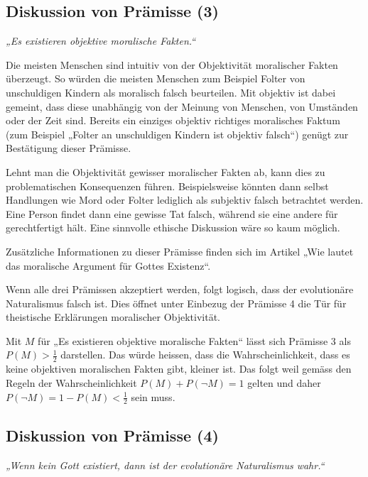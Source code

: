 \documentclass[11pt,a4paper]{article}
\begin{document}
	\subsection{Diskussion von Prämisse (3)}
	
	\textit{„Es existieren objektive moralische Fakten.“}
	
	Die meisten Menschen sind intuitiv von der Objektivität moralischer Fakten überzeugt. So würden die meisten Menschen zum Beispiel Folter von unschuldigen Kindern als moralisch falsch beurteilen. Mit objektiv ist dabei gemeint, dass diese unabhängig von der Meinung von Menschen, von Umständen oder der Zeit sind. Bereits ein einziges objektiv richtiges moralisches Faktum (zum Beispiel „Folter an unschuldigen Kindern ist objektiv falsch“) genügt zur Bestätigung dieser Prämisse.
	
	Lehnt man die Objektivität gewisser moralischer Fakten ab, kann dies zu problematischen Konsequenzen führen. Beispielsweise könnten dann selbst Handlungen wie Mord oder Folter lediglich als subjektiv falsch betrachtet werden. Eine Person findet dann eine gewisse Tat falsch, während sie eine andere für gerechtfertigt hält. Eine sinnvolle ethische Diskussion wäre so kaum möglich.
	
	Zusätzliche Informationen zu dieser Prämisse finden sich im Artikel „Wie lautet das moralische Argument für Gottes Existenz“.
	
	Wenn alle drei Prämissen akzeptiert werden, folgt logisch, dass der evolutionäre Naturalismus falsch ist. Dies öffnet unter Einbezug der Prämisse 4 die Tür für theistische Erklärungen moralischer Objektivität.
	
		\begin{tcolorbox}[title=Mathematik-Box: Prämisse 3]
		Mit \(M\) für „Es existieren objektive moralische Fakten“ lässt sich Prämisse 3 als $P(M) > \frac{1}{2}$ darstellen. Das würde heissen, dass die Wahrscheinlichkeit, dass es keine objektiven moralischen Fakten gibt, kleiner ist. Das folgt weil gemäss den Regeln der Wahrscheinlichkeit $P(M) + P(\neg M) = 1$ gelten und daher $P(\neg M) = 1 - P(M) < \frac{1}{2}$ sein muss.
	\end{tcolorbox}
	
	\subsection{Diskussion von Prämisse (4)}
	
	\textit{„Wenn kein Gott existiert, dann ist der evolutionäre Naturalismus wahr.“}
	
\end{document}
